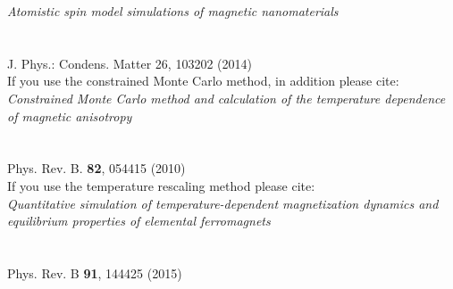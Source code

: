 \noindent \textit{\small Atomistic spin model simulations of magnetic nanomaterials}\\
\vspace{-0.4cm}\\
\\
{\small J. Phys.: Condens. Matter 26, 103202 (2014)}\\

\noindent If you use the constrained Monte Carlo method, in addition please cite:\\

\noindent \textit{\small Constrained Monte Carlo method and calculation of the temperature dependence of magnetic anisotropy}\\
\vspace{-0.4cm}\\
\\
{\small Phys. Rev. B. \textbf{82}, 054415 (2010)}\\

\noindent If you use the temperature rescaling method please cite:\\

\noindent \textit{\small Quantitative simulation of temperature-dependent magnetization dynamics and equilibrium properties of elemental ferromagnets}\\
\vspace{-0.4cm}\\
\\
{\small Phys. Rev. B \textbf{91}, 144425 (2015)}

